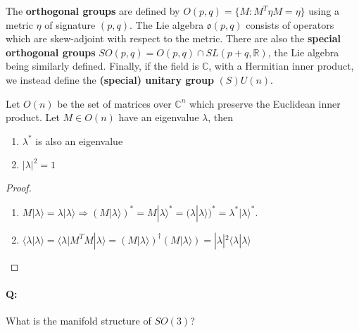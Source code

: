 \documentclass[11pt,fleqn]{article}
\renewenvironment{prop}{\begin{pBox}\begin{propT}}{\end{propT}\end{pBox}}
\begin{document}
\begin{example}
	The \textbf{orthogonal groups} are defined by $O(p,q) = \{ M: M^T \eta M = \eta \}$ using a metric $\eta$ of signature $(p,q)$. The Lie algebra $\mathfrak{o}(p,q)$ consists of operators which are skew-adjoint with respect to the metric. There are also the \textbf{special orthogonal groups} $SO(p,q) = O(p,q) \cap SL(p+q,\mathbb{R})$, the Lie algebra being similarly defined. Finally, if the field is $\mathbb{C}$, with a Hermitian inner product, we instead define the \textbf{(special) unitary group} $(S)U(n)$.
\end{example}

\begin{prop}
		Let $ O(n) $ be the set of matrices over $ \mathbb{C}^n $ which preserve the Euclidean inner product. Let $ M \in O(n) $ have an eigenvalue $ \lambda $, then
			\begin{enumerate}
				\item $ \lambda^* $ is also an eigenvalue
				\item $ |\lambda|^2 = 1 $
			\end{enumerate}
\end{prop}

\begin{proof}\hfill
	\begin{enumerate}
		\item 	$ M |\lambda\rangle = \lambda |\lambda \rangle \Rightarrow \left( M |\lambda \rangle \right)^* = M |\lambda \rangle^* = (\lambda | \lambda \rangle )^* = \lambda^* |\lambda\rangle^* $.
		\item	$ \langle \lambda | \lambda \rangle = \langle \lambda | M^T M | \lambda \rangle = \left( M | \lambda \rangle \right)^\dagger \left( M|\lambda \rangle \right) = |\lambda |^2 \langle \lambda | \lambda \rangle $
	\end{enumerate}
\end{proof}

\paragraph{Q:} What is the manifold structure of $ SO(3) $?
\end{document}
